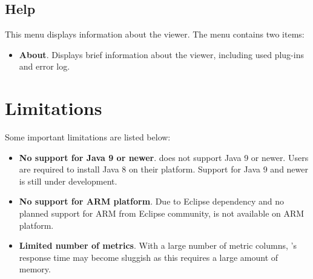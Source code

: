 
\subsection{Help}

This menu displays information about the viewer. The menu contains two items:
\begin{itemize}

\item \textbf{About}.
  Displays brief information about the viewer, including used plug-ins and error log.

\end{itemize}



\section{Limitations}

Some important \hpcviewer{} limitations are listed below:
\begin{itemize}

\item \textbf{No support for Java 9 or newer}.
\hpcviewer{} does not support Java 9 or newer. Users are required to install Java 8 on their platform. Support for Java 9 and newer is still under development.

\item \textbf{No support for ARM platform}.
Due to Eclipse dependency and no planned support for ARM from Eclipse community, \hpcviewer{} is not available on ARM platform.

\item \textbf{Limited number of metrics}.
  With a large number of metric columns, \hpcviewer{}'s response time may become sluggish as this requires a large amount of memory.


\end{itemize}
